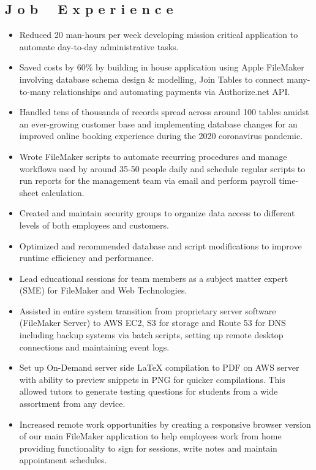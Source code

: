 \documentclass{resume}
\begin{document}
\subsection{J o b \ \ E x p e r i e n c e}

\begin{itemize}
\item \small \raggedright Reduced 20 man-hours per week developing mission critical application to automate day-to-day administrative tasks.
\item \small \raggedright Saved costs by 60\% by building in house application using Apple FileMaker involving database schema design \& modelling, Join Tables to connect many-to-many relationships and automating payments via Authorize.net API.
\item \small \raggedright Handled tens of thousands of records spread across around 100 tables amidst an ever-growing customer base and implementing database changes for an improved online booking experience during the 2020 coronavirus pandemic.
\item \small \raggedright Wrote FileMaker scripts to automate recurring procedures and manage workflows used by around 35-50 people daily and schedule regular scripts to run reports for the management team via email and perform payroll time-sheet calculation.
\item \small \raggedright Created and maintain security groups to organize data access to different levels of both employees and customers.
\item \small \raggedright Optimized and recommended database and script modifications to improve runtime efficiency and performance.
\item \small \raggedright Lead educational sessions for team members as a subject matter expert (SME) for FileMaker and Web Technologies.
\item \small \raggedright Assisted in entire system transition from proprietary server software (FileMaker Server) to AWS EC2, S3 for storage and Route 53 for DNS including backup systems via batch scripts, setting up remote desktop connections and maintaining event logs.
\item \small \raggedright Set up On-Demand server side LaTeX compilation to PDF on AWS server with ability to preview snippets in PNG for quicker compilations. This allowed tutors to generate testing questions for students from a wide assortment from any device.
\item \small \raggedright Increased remote work opportunities by creating a responsive browser version of our main FileMaker application to help employees work from home providing functionality to sign for sessions, write notes and maintain appointment schedules.


\end{itemize}
\end{document}
